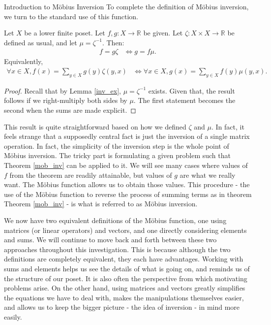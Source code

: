 \documentclass[12pt]{pom_thesis}
\newcommand{\Rr}{\mathbb{R}}
\begin{document}
\begin{chapter}{Introduction to M\"obius Inversion}
To complete the definition of M\"obius inversion, we turn to the standard use of this function. 
\begin{thm}\label{mob_inv}
Let $X$ be a lower finite poset. Let $f,g:X \rightarrow \Rr$ be given. Let $\zeta:X \times X \rightarrow \Rr$ be defined as usual, and let $\mu = \zeta^{-1}$. Then:
\begin{align*}
f = g \zeta & \iff g = f \mu.
\end{align*}
Equivalently,
\begin{align*}
\forall x \in X, f(x) = \sum_{y \in X} g(y)\zeta(y,x) &\iff \forall x \in X, g(x) = \sum_{y \in X} f(y)\mu(y,x).
\end{align*}
\end{thm}
\begin{proof}
Recall that by Lemma \ref{inv_ex}, $\mu = \zeta^{-1}$ exists. Given that, the result follows if we right-multiply both sides by $\mu$. The first statement becomes the second when the sums are made explicit.
\end{proof}

This result is quite straightforward based on how we defined $\zeta$ and $\mu$. In fact, it feels strange that a supposedly central fact is just the inversion of a single matrix operation. In fact, the simplicity of the inversion step is the whole point of M\"obius inversion. The tricky part is formulating a given problem such that Theorem \ref{mob_inv} can be applied to it. We will see many cases where values of $f$ from the theorem are readily attainable, but values of $g$ are what we really want. The M\"obius function allows us to obtain those values. This procedure - the use of the M\"obius function to reverse the process of summing terms as in theorem Theorem \ref{mob_inv} - is what is referred to as M\"obius inversion.

We now have two equivalent definitions of the M\"obius function, one using matrices (or linear operators) and vectors, and one directly considering elements and sums. We will continue to move back and forth between these two approaches throughout this investigation. This is because although the two definitions are completely equivalent, they each have advantages. Working with sums and elements helps us see the details of what is going on, and reminds us of the structure of our poset. It is also often the perspective from which motivating problems arise. On the other hand, using matrices and vectors greatly simplifies the equations we have to deal with, makes the manipulations themselves easier, and allows us to keep the bigger picture - the idea of inversion - in mind more easily. 

\end{chapter}
\end{document}
